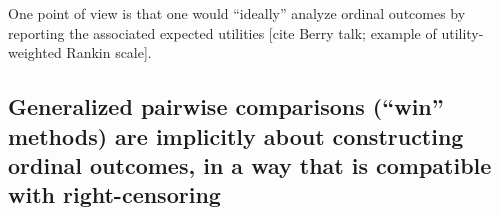 \documentclass[
  11pt,
  fleqn
]{article}
\begin{document}
One point of view is that one would ``ideally'' analyze ordinal
outcomes by reporting the associated expected utilities [cite Berry
talk; example of utility-weighted Rankin scale].

\subsection{Generalized pairwise comparisons (``win'' methods)
  are implicitly about constructing
ordinal outcomes, in a way that is compatible with right-censoring}
\end{document}
